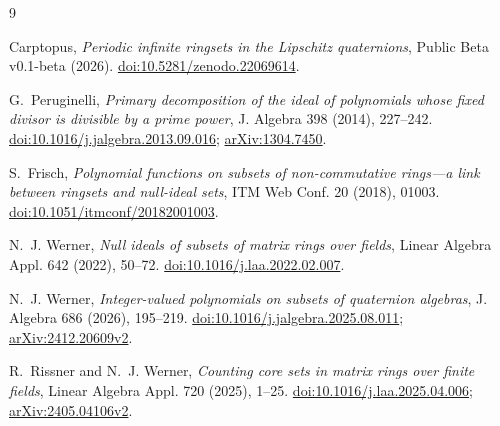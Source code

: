 \documentclass[11pt]{article}
\numberwithin{equation}{section}
\begin{document}
\begin{thebibliography}{9}

Carptopus,
\emph{Periodic infinite ringsets in the Lipschitz quaternions},
Public Beta v0.1-beta (2026).
\href{https://doi.org/10.5281/zenodo.22069614}{doi:10.5281/zenodo.22069614}.

G.~Peruginelli,
\emph{Primary decomposition of the ideal of polynomials whose fixed divisor is divisible by a prime power},
J. Algebra 398 (2014), 227--242.
\href{https://doi.org/10.1016/j.jalgebra.2013.09.016}{doi:10.1016/j.jalgebra.2013.09.016};
\href{https://arxiv.org/abs/1304.7450}{arXiv:1304.7450}.

S.~Frisch,
\emph{Polynomial functions on subsets of non-commutative rings---a link between ringsets and null-ideal sets},
ITM Web Conf. 20 (2018), 01003.
\href{https://doi.org/10.1051/itmconf/20182001003}{doi:10.1051/itmconf/20182001003}.

N.~J. Werner,
\emph{Null ideals of subsets of matrix rings over fields},
Linear Algebra Appl. 642 (2022), 50--72.
\href{https://doi.org/10.1016/j.laa.2022.02.007}{doi:10.1016/j.laa.2022.02.007}.

N.~J. Werner,
\emph{Integer-valued polynomials on subsets of quaternion algebras},
J. Algebra 686 (2026), 195--219.
\href{https://doi.org/10.1016/j.jalgebra.2025.08.011}{doi:10.1016/j.jalgebra.2025.08.011};
\href{https://arxiv.org/abs/2412.20609}{arXiv:2412.20609v2}.

R.~Rissner and N.~J. Werner,
\emph{Counting core sets in matrix rings over finite fields},
Linear Algebra Appl. 720 (2025), 1--25.
\href{https://doi.org/10.1016/j.laa.2025.04.006}{doi:10.1016/j.laa.2025.04.006};
\href{https://arxiv.org/abs/2405.04106}{arXiv:2405.04106v2}.

\end{thebibliography}
\end{document}
